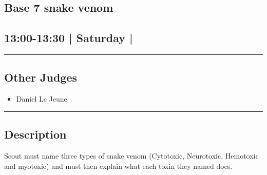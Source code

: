 \documentclass[10pt, A5]{article}
\begin{document}
		\begin{framed}
			\begin{minipage}{\textwidth}

			\setcounter{section}{34}
							\section{\faStar \: Base 7 \faStar \: snake venom}
						
			\subsection*{13:00-13:30 | Saturday | }

			\vspace{0.25cm}
			\hrule
			\vspace{0.25cm}


			\subsection*{Other Judges}
							

				\begin{multicols}{2}

			\begin{itemize}
											\item Daniel Le Jeune
								\end{itemize}

			\vfill\null
			\columnbreak

			\begin{itemize}
								\end{itemize}

			\vfill\null

			\end{multicols}

			\vspace{0.25cm}
			\hrule
			\vspace{0.25cm}

			\begin{minipage}{\textwidth}
			\subsection*{\faListAlt \: Description}
			Scout must name three types of snake venom (Cytotoxic, Neurotoxic, Hemotoxic and myotoxic) and must then explain what each toxin they named does.
			\end{minipage}


	\end{minipage}
	\end{framed}
\end{document}
